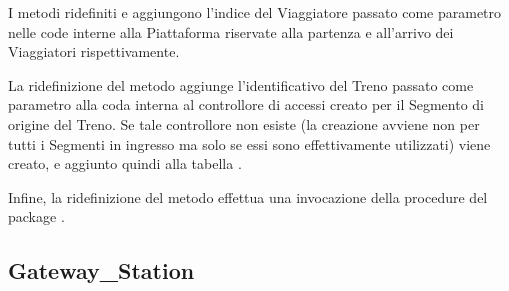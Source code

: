 	I metodi ridefiniti  e  aggiungono l'indice del Viaggiatore passato come parametro nelle code interne alla Piattaforma riservate alla partenza e all'arrivo dei Viaggiatori rispettivamente. 
	
	La ridefinizione del metodo  aggiunge l'identificativo del Treno passato come parametro alla coda interna al controllore di accessi creato per il Segmento di origine del Treno. Se tale controllore non esiste (la creazione avviene non per tutti i Segmenti in ingresso ma solo se essi sono effettivamente utilizzati) viene creato, e aggiunto quindi alla tabella .
	
	Infine, la ridefinizione del metodo  effettua una invocazione della procedure  del package .
	
	\subsection{Gateway\_Station}
	
